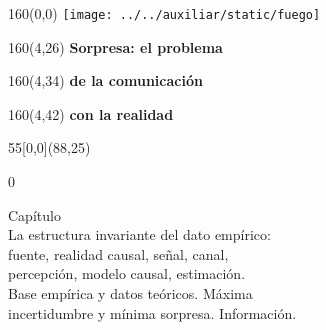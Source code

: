 \documentclass[shownotes,aspectratio=169]{beamer}
\newcounter{capitulo}
\newcommand{\unidad}{\thecapitulo \stepcounter{capitulo}}
\begin{document}
\begin{frame}

\begin{textblock}{160}(0,0)
\texttt{[image: ../../auxiliar/static/fuego]}
\end{textblock}

\begin{textblock}{160}(4,26)
\LARGE \textcolor{black!5}{\fontsize{22}{0}\selectfont \textbf{Sorpresa: el problema}}
\end{textblock}
\begin{textblock}{160}(4,34)
\LARGE \textcolor{black!5}{\fontsize{22}{0}\selectfont \textbf{de la comunicación}}
\end{textblock}
\begin{textblock}{160}(4,42)
\LARGE \textcolor{black!5}{\fontsize{22}{0}\selectfont \textbf{con la realidad}}
\end{textblock}



\begin{textblock}{55}[0,0](88,25)
\begin{turn}{0}
\parbox{7cm}{\sloppy\setlength\parfillskip{0pt}
\textcolor{black!0}{Capítulo \unidad} \\
\small\textcolor{black!5}{\hspace{0.05cm}La estructura invariante del dato empírico:} \\
\small\textcolor{black!5}{\hspace{0.1cm}fuente, realidad causal, señal, canal,} \\ \small\textcolor{black!5}{\hspace{0.05cm}percepción, modelo causal, estimación.} \\
\small\textcolor{black!5}{\hspace{-0.15cm}Base empírica y datos teóricos. Máxima} \\
\small\textcolor{black!5}{\hspace{-0.35cm}incertidumbre y mínima sorpresa. Información.} \\
}
\end{turn}
\end{textblock}


\end{frame}
\end{document}
